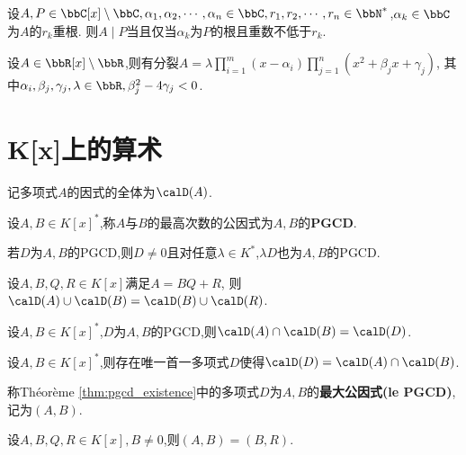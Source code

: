 \begin{prop}
    设$A, P \in \bbC[x] \setminus \bbC, \alpha_1, \alpha_2, \cdots, \alpha_n \in \bbC,
    r_1, r_2, \cdots, r_n \in \bbN^*$,$\alpha_k \in \bbC$为$A$的$r_k$重根.
    则$A \mid P$当且仅当$\alpha_k$为$P$的根且重数不低于$r_k$.
\end{prop}

\begin{prop}
    设$A \in \bbR[x] \setminus \bbR$,则有分裂$A = \lambda \prod\limits_{i = 1}^m
    (x - \alpha_i) \prod\limits_{j = 1}^n (x^2 + \beta_j x + \gamma_j)$,
    其中$\alpha_i, \beta_j, \gamma_j, \lambda \in \bbR, \beta_j^2 - 4 \gamma_j < 0$.
\end{prop}

\section{K[x]上的算术}

记多项式$A$的因式的全体为$\calD(A)$.

\begin{deff}
    设$A, B \in K[x]^*$,称$A$与$B$的最高次数的公因式为$A, B$的\textbf{PGCD}.
\end{deff}

\begin{rqq}
    若$D$为$A, B$的PGCD,则$D \neq 0$且对任意$\lambda \in K^*$,$\lambda D$也为$A, B$的PGCD.
\end{rqq}

\begin{lem}
    设$A, B, Q, R \in K[x]$满足$A = BQ + R$,
    则$\calD(A) \cup \calD(B) = \calD(B) \cup \calD(R)$.
\end{lem}

\begin{prop}
    设$A, B \in K[x]^*$,$D$为$A, B$的PGCD,则$\calD(A) \cap \calD(B) = \calD(D)$.
\end{prop}

\begin{thm}\label{thm:pgcd_existence}
    设$A, B \in K[x]^*$,则存在唯一首一多项式$D$使得$\calD(D) = \calD(A) \cap \calD(B)$.
\end{thm}

\begin{deff}
    称Théorème \ref{thm:pgcd_existence}中的多项式$D$为$A, B$的\textbf{最大公因式(le PGCD)},记为$(A, B)$.
\end{deff}

\begin{rqq}
    设$A, B, Q, R \in K[x], B \neq 0$,则$(A, B) = (B, R)$.
\end{rqq}

